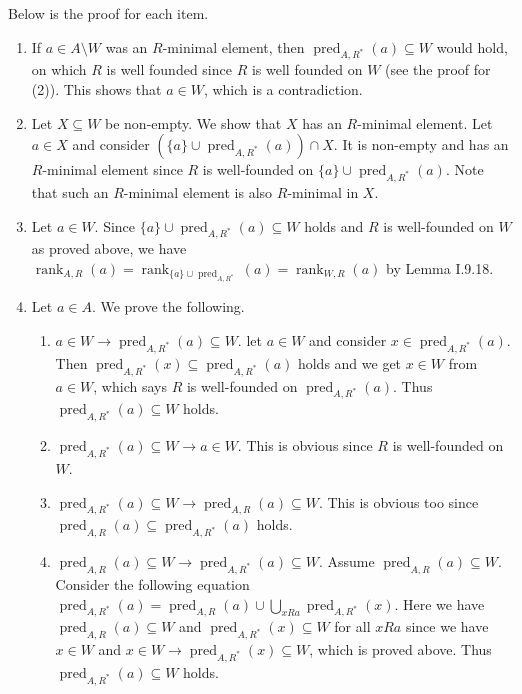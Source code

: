 \documentclass[12pt]{article}
\newcommand{\pred}{\mathop{\mathrm{pred}}}
\newcommand{\rank}{\mathop{\mathrm{rank}}}
\theoremstyle{definition}
\newenvironment{customthm}[1]
  {\renewcommand\theinnercustomthm{#1}\innercustomthm}
  {\endinnercustomthm}
\begin{document}
\begin{customthm}{I.9.46}
  Below is the proof for each item.
  \begin{enumerate}[label=\arabic*.]
    \item If $a\in A\setminus W$ was an $R$-minimal element, then $\pred_{A,R^*}(a)\subseteq W$ would hold, on which $R$ is well founded since $R$ is well founded on $W$ (see the proof for (2)). This shows that $a\in W$, which is a contradiction.
    \item Let $X\subseteq W$ be non-empty. We show that $X$ has an $R$-minimal element. Let $a\in X$ and consider $(\{a\}\cup\pred_{A,R^*}(a))\cap X$. It is non-empty and has an $R$-minimal element since $R$ is well-founded on $\{a\}\cup\pred_{A,R^*}(a)$. Note that such an $R$-minimal element is also $R$-minimal in $X$.
    \item Let $a\in W$. Since $\{a\}\cup\pred_{A,R^*}(a)\subseteq W$ holds and $R$ is well-founded on $W$ as proved above, we have $\rank_{A,R}(a)=\rank_{\{a\}\cup\pred_{A,R^*}}(a)=\rank_{W,R}(a)$ by Lemma I.9.18.
    \item Let $a\in A$. We prove the following.
    \begin{enumerate}
      \item\underline{$a\in W\rightarrow\pred_{A,R^*}(a)\subseteq W$}. let $a\in W$ and consider $x\in\pred_{A,R^*}(a)$. Then $\pred_{A,R^*}(x)\subseteq \pred_{A,R^*}(a)$ holds and we get $x\in W$ from $a\in W$, which says $R$ is well-founded on $\pred_{A,R^*}(a)$. Thus $\pred_{A,R^*}(a)\subseteq W$ holds.
      \item\underline{$\pred_{A,R^*}(a)\subseteq W\rightarrow a\in W$}. This is obvious since $R$ is well-founded on $W$.
      \item\underline{$\pred_{A,R^*}(a)\subseteq W\rightarrow\pred_{A,R}(a)\subseteq W$}. This is obvious too since $\pred_{A,R}(a)\subseteq\pred_{A,R^*}(a)$ holds.
      \item\underline{$\pred_{A,R}(a)\subseteq W\rightarrow\pred_{A,R^*}(a)\subseteq W$}. Assume $\pred_{A,R}(a)\subseteq W$. Consider the following equation $\pred_{A,R^*}(a)=\pred_{A,R}(a)\cup\bigcup_{xRa}\pred_{A,R^*}(x)$. Here we have $\pred_{A,R}(a)\subseteq W$ and $\pred_{A,R^*}(x)\subseteq W$ for all $xRa$ since we have $x\in W$ and $x\in W\rightarrow\pred_{A,R^*}(x)\subseteq W$, which is proved above. Thus $\pred_{A,R^*}(a)\subseteq W$ holds.
    \end{enumerate}
  \end{enumerate}
\end{customthm}
\end{document}
